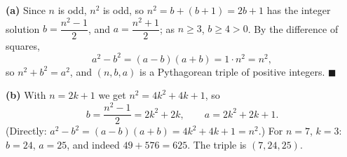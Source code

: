 \textbf{(a)} Since $n$ is odd, $n^2$ is odd, so $n^2=b+(b+1)=2b+1$ has the integer solution $b=\dfrac{n^2-1}{2}$, and $a=\dfrac{n^2+1}{2}$; as $n\ge3$, $b\ge4>0$. By the difference of squares,
\[a^2-b^2=(a-b)(a+b)=1\cdot n^2=n^2,\]
so $n^2+b^2=a^2$, and $(n,b,a)$ is a Pythagorean triple of positive integers. $\blacksquare$

\textbf{(b)} With $n=2k+1$ we get $n^2=4k^2+4k+1$, so
\[b=\dfrac{n^2-1}{2}=2k^2+2k,\qquad a=2k^2+2k+1.\]
(Directly: $a^2-b^2=(a-b)(a+b)=4k^2+4k+1=n^2$.) For $n=7$, $k=3$: $b=24$, $a=25$, and indeed $49+576=625$. The triple is $\boxed{(7,24,25)}$.
